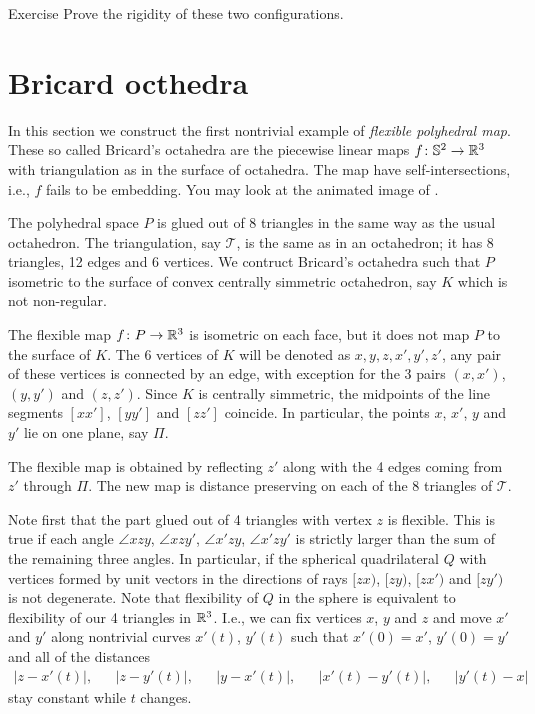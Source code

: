 \begin{thm}{Exercise}\label{ex:rigit/flex}
Prove the rigidity of these two configurations. 
\end{thm}






\section{Bricard octhedra}

In this section we construct the first nontrivial example of \emph{flexible polyhedral map}.
These so called Bricard's octahedra are the piecewise linear maps $f\:\SS^2\z\to\RR^3$
with triangulation as in the surface of octahedra.
The map  have self-intersections,
i.e., $f$ fails to be embedding.
You may look at the animated image of .

The polyhedral space $P$ is glued out of 8 triangles in the same way as the usual octahedron.
The triangulation, say $\mathcal{T}$, is the same as in an octahedron; it has 8 triangles, 12 edges and 6 vertices.
We contruct Bricard's octahedra such that $P$ isometric to the surface of convex centrally simmetric octahedron, 
say $K$ which is not non-regular.

The flexible map $f\colon P\to\mathbb{R}^3$ is isometric on each face,
but it does not map $P$ to the surface of $K$.
The 6 vertices of $K$ will be denoted as $x,y,z,x',y',z'$,
any pair of these vertices is connected by an edge, with exception for the 3 pairs $(x,x')$, $(y,y')$ and $(z,z')$.
Since $K$ is centrally simmetric,
the midpoints of the line segments $[xx']$, $[yy']$ and $[zz']$ coincide.
In particular, the points $x$, $x'$, $y$ and $y'$ lie on one plane, say $\Pi$.

The flexible map is obtained by reflecting $z'$ along with the 4 edges coming from $z'$ through $\Pi$.
The new map is distance preserving on each of the 8 triangles of $\mathcal{T}$.

 Note first that the part glued out of 4 triangles with vertex $z$ is flexible.
This is true if each angle $\angle xzy$, $\angle xzy'$, $\angle x'zy$, $\angle x'zy'$ is strictly larger than the sum of the remaining three angles.
In particular, if the spherical quadrilateral $Q$ with vertices formed by unit vectors in the directions of rays $[zx)$, $[zy)$, $[zx')$ and $[zy')$ is not degenerate.
Note that flexibility of $Q$ in the sphere is equivalent to flexibility of our 4 triangles in $\mathbb{R}^3$.
I.e., we can fix vertices $x$, $y$ and $z$ and move $x'$ and $y'$ along nontrivial curves  $x'(t)$, $y'(t)$ 
such that
 $x'(0)=x'$, $y'(0)=y'$
and all of the distances 
\begin{align*}
|z-x'(t)|,&&|z-y'(t)|,&&
|y-x'(t)|, &&|x'(t)-y'(t)|,&&|y'(t)-x|
\end{align*}
stay constant while $t$ changes. 


